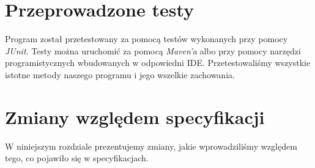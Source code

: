 \documentclass[10pt, a4paper]{report}
\begin{document}
\newpage

\section{Przeprowadzone testy}\label{sec:przeprowadzone-testy}
Program został przetestowany za pomocą testów wykonanych przy pomocy
\textit{JUnit}. Testy można uruchomić za pomocą \textit{Maven'a} albo przy
pomocy narzędzi programistycznych wbudowanych w odpowiedni IDE.
Przetestowaliśmy wszystkie istotne metody naszego programu i jego wszelkie
zachowania.

\section{Zmiany względem specyfikacji}\label{sec:zmiany-względem-specyfikacji}
W niniejszym rozdziale prezentujemy zmiany, jakie wprowadziliśmy względem tego,
co pojawiło się w specyfikacjach.
\end{document}
